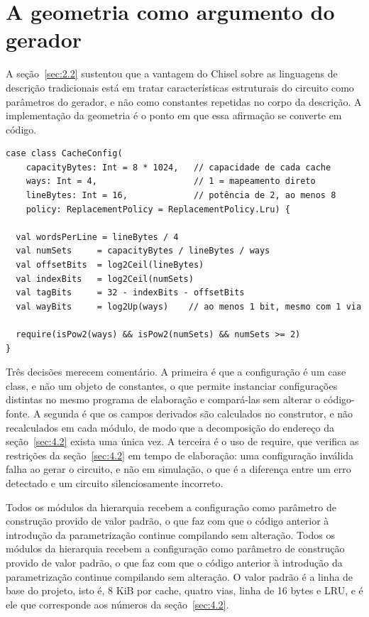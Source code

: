 \section{A geometria como argumento do gerador}\label{sec:5.2}

A seção~\ref{sec:2.2} sustentou que a vantagem do Chisel sobre as linguagens de descrição tradicionais está em tratar características estruturais do circuito como parâmetros do gerador, e não como constantes repetidas no corpo da descrição. A implementação da geometria é o ponto em que essa afirmação se converte em código.


{\footnotesize
\begin{verbatim}
case class CacheConfig(
    capacityBytes: Int = 8 * 1024,   // capacidade de cada cache
    ways: Int = 4,                   // 1 = mapeamento direto
    lineBytes: Int = 16,             // potência de 2, ao menos 8
    policy: ReplacementPolicy = ReplacementPolicy.Lru) {

  val wordsPerLine = lineBytes / 4
  val numSets     = capacityBytes / lineBytes / ways
  val offsetBits  = log2Ceil(lineBytes)
  val indexBits   = log2Ceil(numSets)
  val tagBits     = 32 - indexBits - offsetBits
  val wayBits     = log2Up(ways)    // ao menos 1 bit, mesmo com 1 via

  require(isPow2(ways) && isPow2(numSets) && numSets >= 2)
}
\end{verbatim}
}


Três decisões merecem comentário. A primeira é que a configuração é um case class, e não um objeto de constantes, o que permite instanciar configurações distintas no mesmo programa de elaboração e compará-las sem alterar o código-fonte. A segunda é que os campos derivados são calculados no construtor, e não recalculados em cada módulo, de modo que a decomposição do endereço da seção~\ref{sec:4.2} exista uma única vez. A terceira é o uso de require, que verifica as restrições da seção~\ref{sec:4.2} em tempo de elaboração: uma configuração inválida falha ao gerar o circuito, e não em simulação, o que é a diferença entre um erro detectado e um circuito silenciosamente incorreto.

Todos os módulos da hierarquia recebem a configuração como parâmetro de construção provido de valor padrão, o que faz com que o código anterior à introdução da parametrização continue compilando sem alteração. Todos os módulos da hierarquia recebem a configuração como parâmetro de construção provido de valor padrão, o que faz com que o código anterior à introdução da parametrização continue compilando sem alteração. O valor padrão é a linha de base do projeto, isto é, 8 KiB por cache, quatro vias, linha de 16 bytes e LRU, e é ele que corresponde aos números da seção~\ref{sec:4.2}.


